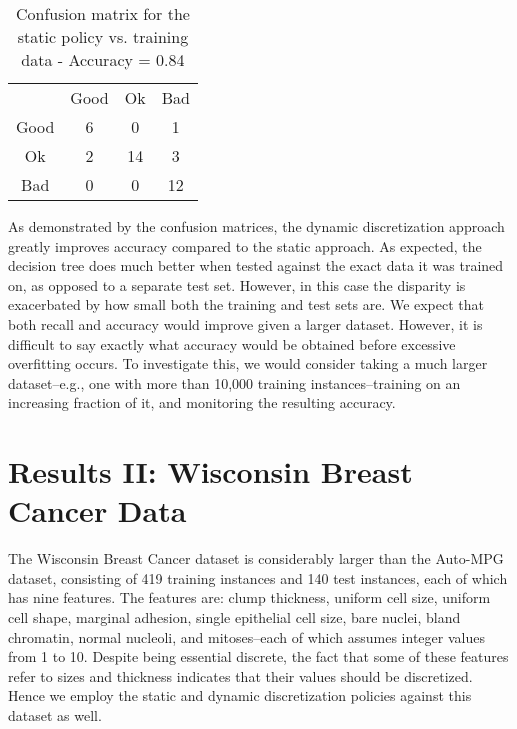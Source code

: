 \documentclass[12pt, conference, compsocconf]{IEEEtran}
\begin{document}
\begin{table}[h!]
\centering
\label{cm-static-training}
\begin{tabular}{cccc}
                          & Good                   & Ok                      & Bad                     \\ \cline{2-4} 
\multicolumn{1}{c|}{Good} & \multicolumn{1}{c|}{6} & \multicolumn{1}{c|}{0}  & \multicolumn{1}{c|}{1}  \\ \cline{2-4} 
\multicolumn{1}{c|}{Ok}   & \multicolumn{1}{c|}{2} & \multicolumn{1}{c|}{14} & \multicolumn{1}{c|}{3}  \\ \cline{2-4} 
\multicolumn{1}{c|}{Bad}  & \multicolumn{1}{c|}{0} & \multicolumn{1}{c|}{0}  & \multicolumn{1}{c|}{12} \\ \cline{2-4} 
\end{tabular}
\caption{Confusion matrix for the static policy vs. training data - Accuracy = 0.84}
\end{table}

As demonstrated by the confusion matrices, the dynamic discretization approach greatly improves accuracy compared to the static approach. 
As expected, the decision tree does much better when tested against the exact data it was trained on, as opposed to a separate test set. 
However, in this case the disparity is exacerbated by how small both the training and test sets are. 
We expect that both recall and accuracy would improve given a larger dataset. However, it is difficult to say exactly what accuracy would be obtained before excessive overfitting occurs. 
To investigate this, we would consider taking a much larger dataset--e.g., one with more than 10,000 training instances--training on an increasing fraction of it, and monitoring the resulting accuracy. 

\section{Results II: Wisconsin Breast Cancer Data}
The Wisconsin Breast Cancer dataset is considerably larger than the Auto-MPG dataset, consisting of 419 training instances and 140 test instances, each of which has nine features. 
The features are: clump thickness, uniform cell size, uniform cell shape, marginal adhesion, single epithelial cell size, bare nuclei, bland chromatin, normal nucleoli, and mitoses--each of which assumes integer values from 1 to 10. 
Despite being essential discrete, the fact that some of these features refer to sizes and thickness indicates that their values should be discretized. Hence we employ the static and dynamic discretization policies against this dataset as well.
\end{document}
